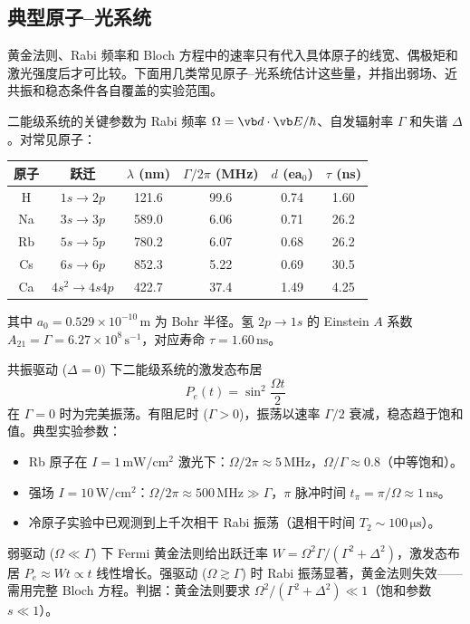 \subsection{典型原子--光系统}
\label{sec:rabi-bloch-experiment}

黄金法则、Rabi 频率和 Bloch 方程中的速率只有代入具体原子的线宽、偶极矩和激光强度后才可比较。下面用几类常见原子--光系统估计这些量，并指出弱场、近共振和稳态条件各自覆盖的实验范围。

二能级系统的关键参数为 Rabi 频率 $\Omega=\vb d\cdot\vb E/\hbar$、自发辐射率 $\Gamma$ 和失谐 $\Delta$。对常见原子：
\begin{center}
\begin{tabular}{cccccc}
\hline
原子 & 跃迁 & $\lambda$ (nm) & $\Gamma/2\pi$ (MHz) & $d$ (ea$_0$) & $\tau$ (ns) \\
\hline
H & $1s\to2p$ & 121.6 & 99.6 & 0.74 & 1.60 \\
Na & $3s\to3p$ & 589.0 & 6.06 & 0.71 & 26.2 \\
Rb & $5s\to5p$ & 780.2 & 6.07 & 0.68 & 26.2 \\
Cs & $6s\to6p$ & 852.3 & 5.22 & 0.69 & 30.5 \\
Ca & $4s^2\to4s4p$ & 422.7 & 37.4 & 1.49 & 4.25 \\
\hline
\end{tabular}
\end{center}
其中 $a_0=0.529\times10^{-10}\,\mathrm{m}$ 为 Bohr 半径。氢 $2p\to1s$ 的 Einstein $A$ 系数 $A_{21}=\Gamma=6.27\times10^8\,\mathrm{s}^{-1}$，对应寿命 $\tau=1.60\,\mathrm{ns}$。

共振驱动 ($\Delta=0$) 下二能级系统的激发态布居
\[
 P_e(t)=\sin^2\frac{\Omega t}{2}
\]
在 $\Gamma=0$ 时为完美振荡。有阻尼时 ($\Gamma>0$)，振荡以速率 $\Gamma/2$ 衰减，稳态趋于饱和值。典型实验参数：
\begin{itemize}
 \item Rb 原子在 $I=1\,\mathrm{mW/cm^2}$ 激光下：$\Omega/2\pi\approx5\,\mathrm{MHz}$，$\Omega/\Gamma\approx0.8$（中等饱和）。
 \item 强场 $I=10\,\mathrm{W/cm^2}$：$\Omega/2\pi\approx500\,\mathrm{MHz}\gg\Gamma$，$\pi$ 脉冲时间 $t_\pi=\pi/\Omega\approx1\,\mathrm{ns}$。
 \item 冷原子实验中已观测到上千次相干 Rabi 振荡（退相干时间 $T_2\sim100\,\mathrm{\mu s}$）。
\end{itemize}

弱驱动 ($\Omega\ll\Gamma$) 下 Fermi 黄金法则给出跃迁率 $W=\Omega^2\Gamma/(\Gamma^2+\Delta^2)$，激发态布居 $P_e\approx Wt\propto t$ 线性增长。强驱动 ($\Omega\gtrsim\Gamma$) 时 Rabi 振荡显著，黄金法则失效——需用完整 Bloch 方程。判据：黄金法则要求 $\Omega^2/(\Gamma^2+\Delta^2)\ll1$（饱和参数 $s\ll1$）。

